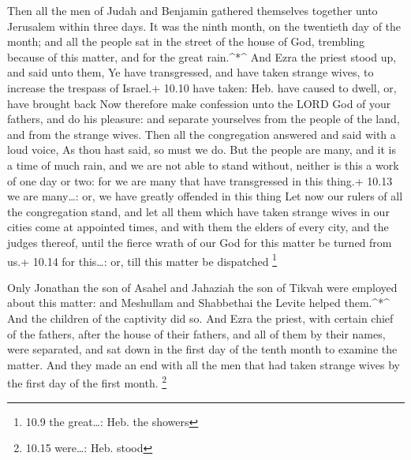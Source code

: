  Then all the men of Judah and Benjamin gathered themselves
together unto Jerusalem within three days. It was the ninth month, on
the twentieth day of the month; and all the people sat in the street of
the house of God, trembling because of this matter, and for the great
rain.\^{}*\^{}  And Ezra the priest stood up, and said unto
them, Ye have transgressed, and have taken strange wives, to increase
the trespass of Israel.+ 10.10 have taken: Heb. have caused to dwell,
or, have brought back  Now therefore make confession unto
the LORD God of your fathers, and do his pleasure: and separate
yourselves from the people of the land, and from the strange wives.
 Then all the congregation answered and said with a loud
voice, As thou hast said, so must we do.  But the people
are many, and it is a time of much rain, and we are not able to stand
without, neither is this a work of one day or two: for we are many that
have transgressed in this thing.+ 10.13 we are many\ldots: or, we have
greatly offended in this thing  Let now our rulers of all
the congregation stand, and let all them which have taken strange wives
in our cities come at appointed times, and with them the elders of every
city, and the judges thereof, until the fierce wrath of our God for this
matter be turned from us.+ 10.14 for this\ldots: or, till this matter be
dispatched \footnote{10.9 the great\ldots: Heb. the showers}

 Only Jonathan the son of Asahel and Jahaziah the son of
Tikvah were employed about this matter: and Meshullam and Shabbethai the
Levite helped them.\^{}*\^{}  And the children of the
captivity did so. And Ezra the priest, with certain chief of the
fathers, after the house of their fathers, and all of them by their
names, were separated, and sat down in the first day of the tenth month
to examine the matter.  And they made an end with all the
men that had taken strange wives by the first day of the first month.
\footnote{10.15 were\ldots: Heb. stood}

